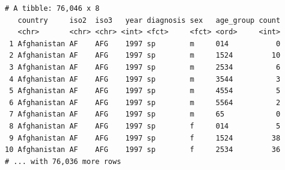 \documentclass[
  11pt,
]{krantz}
\newenvironment{Shaded}{\begin{snugshade}}{\end{snugshade}}
\newcommand{\CommentTok}[1]{\textcolor[rgb]{0.37,0.37,0.37}{\textit{#1}}}
\newcommand{\DataTypeTok}[1]{\textcolor[rgb]{0.27,0.27,0.27}{#1}}
\newcommand{\KeywordTok}[1]{\textcolor[rgb]{0.27,0.27,0.27}{\textbf{#1}}}
\newcommand{\NormalTok}[1]{#1}
\newcommand{\OperatorTok}[1]{\textcolor[rgb]{0.43,0.43,0.43}{\textbf{#1}}}
\newcommand{\OtherTok}[1]{\textcolor[rgb]{0.37,0.37,0.37}{#1}}
\newcommand{\StringTok}[1]{\textcolor[rgb]{0.5,0.5,0.5}{#1}}
\begin{document}
\begin{Shaded}
\end{Shaded}

\begin{verbatim}
# A tibble: 76,046 x 8
   country     iso2  iso3   year diagnosis sex   age_group count
   <chr>       <chr> <chr> <int> <fct>     <fct> <ord>     <int>
 1 Afghanistan AF    AFG    1997 sp        m     014           0
 2 Afghanistan AF    AFG    1997 sp        m     1524         10
 3 Afghanistan AF    AFG    1997 sp        m     2534          6
 4 Afghanistan AF    AFG    1997 sp        m     3544          3
 5 Afghanistan AF    AFG    1997 sp        m     4554          5
 6 Afghanistan AF    AFG    1997 sp        m     5564          2
 7 Afghanistan AF    AFG    1997 sp        m     65            0
 8 Afghanistan AF    AFG    1997 sp        f     014           5
 9 Afghanistan AF    AFG    1997 sp        f     1524         38
10 Afghanistan AF    AFG    1997 sp        f     2534         36
# ... with 76,036 more rows
\end{verbatim}
\end{document}

